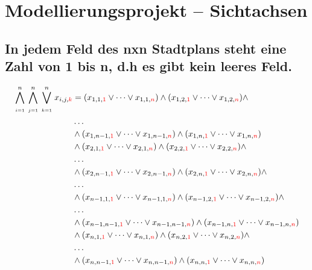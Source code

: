 \documentclass[11pt, a4paper]{article}
\begin{document}
	
	
	\section{Modellierungsprojekt – Sichtachsen}
	\subsection{In jedem Feld des nxn Stadtplans steht eine Zahl von 1 bis n, d.h es gibt kein leeres Feld.}
	\begin{align*}
		\bigwedge_{\atop i=1}^n \bigwedge_{\atop j=1}^n \bigvee_{\atop k=1}^n
		x_{i,j,{\color{red} k}} &= (x_{1,1,{\color{red} 1}} \vee \dots \vee x_{1,1,{\color{red} n}}) \wedge (x_{1,2,{\color{red} 1}} \vee \dots \vee x_{1,2,{\color{red} n}}) \wedge 
		\\ & \dots \\
		& \wedge (x_{1,n-1,{\color{red} 1}} \vee \dots \vee x_{1,n-1,{\color{red} n}}) \wedge (x_{1,n,{\color{red} 1}} \vee \dots \vee x_{1,n,{\color{red} n}}) \\
		& \wedge (x_{2,1,{\color{red} 1}} \vee \dots \vee x_{2,1,{\color{red} n}})
		\wedge (x_{2,2,{\color{red} 1}} \vee \dots \vee x_{2,2,{\color{red} n}}) \wedge 
		\\ & \dots \\
		& \wedge (x_{2,n-1,{\color{red} 1}} \vee \dots \vee x_{2,n-1,{\color{red} n}})
		\wedge (x_{2,n,{\color{red} 1}} \vee \dots \vee x_{2,n,{\color{red} n}}) \wedge 
		\\ & \dots \\
		& \wedge (x_{n-1,1,{\color{red} 1}} \vee \dots \vee x_{n-1,1,{\color{red} n}}) 
		\wedge (x_{n-1,2,{\color{red} 1}} \vee \dots \vee x_{n-1,2,{\color{red} n}}) \wedge \\ & \dots \\
		& \wedge (x_{n-1,n-1,{\color{red} 1}} \vee \dots \vee x_{n-1,n-1,{\color{red} n}})
		\wedge (x_{n-1,n,{\color{red} 1}} \vee \dots \vee x_{n-1,n,{\color{red} n}}) \\
		& \wedge (x_{n,1,{\color{red} 1}} \vee \dots \vee x_{n,1,{\color{red} n}}) 
		\wedge (x_{n,2,{\color{red} 1}} \vee \dots \vee x_{n,2,{\color{red} n}}) \wedge 
		\\ & \dots \\
		& \wedge (x_{n,n-1,{\color{red} 1}} \vee \dots \vee x_{n,n-1,{\color{red} n}})
		\wedge (x_{n,n,{\color{red} 1}} \vee \dots \vee x_{n,n,{\color{red} n}})
	\end{align*}
	\bigskip
		
\end{document}
